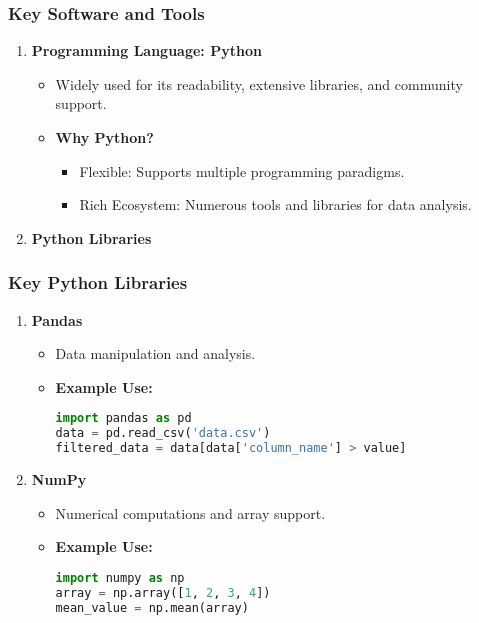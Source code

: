 \documentclass[aspectratio=169]{beamer}
\begin{document}
\begin{frame}
    \frametitle{Key Software and Tools}
    \begin{enumerate}
        \item \textbf{Programming Language: Python}
        \begin{itemize}
            \item Widely used for its readability, extensive libraries, and community support.
            \item \textbf{Why Python?}
                \begin{itemize}
                    \item Flexible: Supports multiple programming paradigms.
                    \item Rich Ecosystem: Numerous tools and libraries for data analysis.
                \end{itemize}
        \end{itemize}
        
        \item \textbf{Python Libraries}
    \end{enumerate}
\end{frame}

\begin{frame}[fragile]
    \frametitle{Key Python Libraries}
    \begin{enumerate}
        \item \textbf{Pandas}
        \begin{itemize}
            \item Data manipulation and analysis.
            \item \textbf{Example Use:}
            \begin{lstlisting}[language=Python]
import pandas as pd
data = pd.read_csv('data.csv')
filtered_data = data[data['column_name'] > value]
            \end{lstlisting}
        \end{itemize}
        
        \item \textbf{NumPy}
        \begin{itemize}
            \item Numerical computations and array support.
            \item \textbf{Example Use:}
            \begin{lstlisting}[language=Python]
import numpy as np
array = np.array([1, 2, 3, 4])
mean_value = np.mean(array)
            \end{lstlisting}
        \end{itemize}
    \end{enumerate}
\end{frame}
\end{document}
